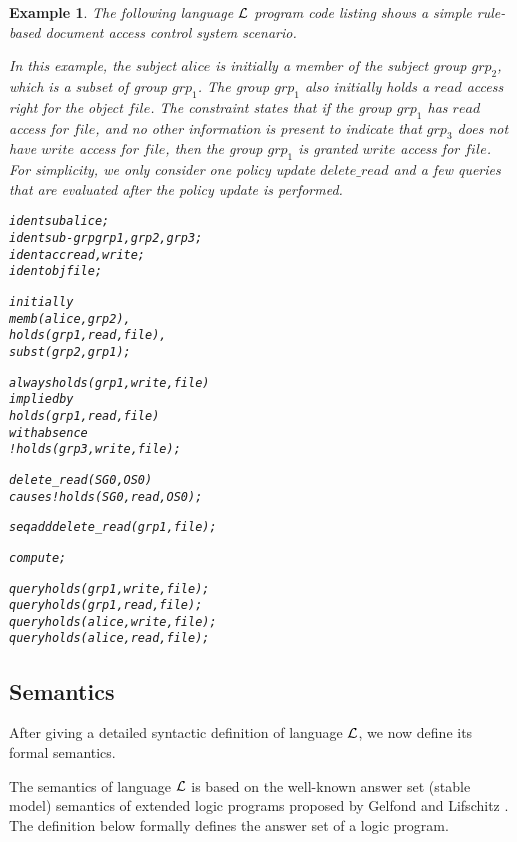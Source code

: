 \documentclass[11pt]{report}
\newtheorem{vexample}{Example}[chapter]
\newenvironment{vverbatim}
{
  \begin{alltt}
}
{
    \vspace{-\baselineskip}
  \end{alltt}
}
\begin{document}
          \begin{vexample}
            \label{ex-2-1}
            The following language ${\cal L}$ program code listing shows a
            simple rule-based document access control system scenario.

            In this example, the subject $alice$ is initially a member of the
            subject group $grp_2$, which is a subset of group $grp_1$. The
            group $grp_1$ also initially holds a $read$ access right for the
            object $file$. The constraint states that if the group $grp_1$ has
            $read$ access for $file$, and no other information is present to
            indicate that $grp_3$ does not have $write$ access for $file$, then
            the group $grp_1$ is granted $write$ access for $file$. For
            simplicity, we only consider one policy update $delete\_read$ and a
            few queries that are evaluated after the policy update is
            performed.

            \begin{vverbatim}
  ident sub alice;
  ident sub-grp grp1, grp2, grp3;
  ident acc read, write;
  ident obj file;

  initially
    memb(alice, grp2),
    holds(grp1, read, file),
    subst(grp2, grp1);

  always holds(grp1, write, file)
    implied by
      holds(grp1, read, file)
    with absence
      !holds(grp3, write, file);

  delete\_read(SG0, OS0)
    causes !holds(SG0, read, OS0);

  seq add delete\_read(grp1, file);

  compute;

  query holds(grp1, write, file);
  query holds(grp1, read, file);
  query holds(alice, write, file);
  query holds(alice, read, file);
            \end{vverbatim}
          \end{vexample}

      \subsection{Semantics}
        \label{subsec-langl-semantics}

        After giving a detailed syntactic definition of language ${\cal L}$,
        we now define its formal semantics.

        The semantics of language ${\cal L}$ is based on the well-known answer
        set (stable model) semantics of extended logic programs proposed by
        Gelfond and Lifschitz \cite{GE}. The definition below formally defines
        the answer set of a logic program.
\end{document}

